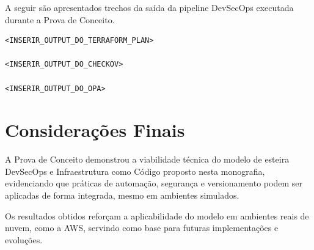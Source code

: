 A seguir são apresentados trechos da saída da pipeline DevSecOps executada durante
a Prova de Conceito.

\begin{verbatim}
<INSERIR_OUTPUT_DO_TERRAFORM_PLAN>

<INSERIR_OUTPUT_DO_CHECKOV>

<INSERIR_OUTPUT_DO_OPA>
\end{verbatim}

\section{Considerações Finais}

A Prova de Conceito demonstrou a viabilidade técnica do modelo de esteira DevSecOps
e Infraestrutura como Código proposto nesta monografia, evidenciando que práticas
de automação, segurança e versionamento podem ser aplicadas de forma integrada,
mesmo em ambientes simulados.

Os resultados obtidos reforçam a aplicabilidade do modelo em ambientes reais de
nuvem, como a AWS, servindo como base para futuras implementações e evoluções.